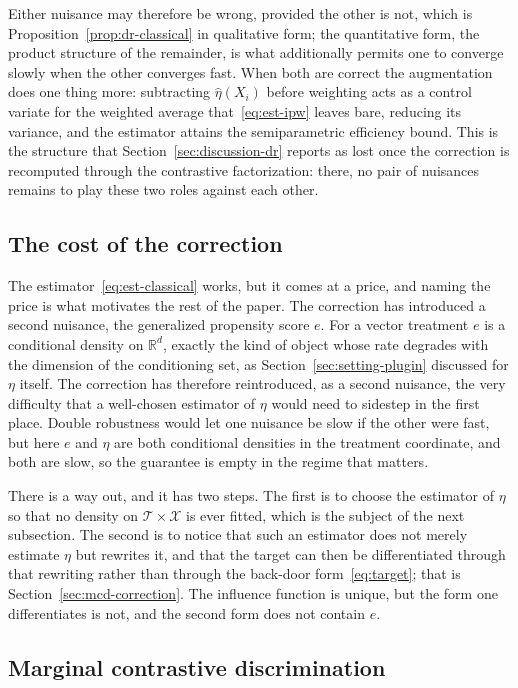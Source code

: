 \documentclass[11pt]{article}
\theoremstyle{plain}
\theoremstyle{definition}
\theoremstyle{remark}
\newcommand{\R}{\mathbb{R}}
\newcommand{\cX}{\ensuremath{\mathcal{X}}}
\newcommand{\cT}{\ensuremath{\mathcal{T}}}
\newcommand{\gps}{e}
\begin{document}
Either nuisance may therefore be wrong, provided the other is not, which is
Proposition~\ref{prop:dr-classical} in qualitative form; the quantitative form, the product
structure of the remainder, is what additionally permits one to converge slowly when the other
converges fast. When both are correct the augmentation does one thing more: subtracting
$\widehat\eta(X_i)$ before weighting acts as a control variate for the weighted average
that~\eqref{eq:est-ipw} leaves bare, reducing its variance, and the estimator attains the
semiparametric efficiency bound. This is the structure that Section~\ref{sec:discussion-dr}
reports as lost once the correction is recomputed through the contrastive factorization:
there, no pair of nuisances remains to play these two roles against each other.

\subsection{The cost of the correction}
\label{sec:eif-cost}

The estimator~\eqref{eq:est-classical} works, but it comes at a price, and naming the price is
what motivates the rest of the paper. The correction has introduced a second nuisance, the
generalized propensity score $\gps$. For a vector treatment $\gps$ is a conditional density on
$\R^{d}$, exactly the kind of object whose rate degrades with the dimension of the conditioning
set, as Section~\ref{sec:setting-plugin} discussed for $\eta$ itself. The correction has
therefore reintroduced, as a second nuisance, the very difficulty that a well-chosen estimator
of $\eta$ would need to sidestep in the first place. Double robustness would let one nuisance
be slow if the other were fast, but here $\gps$ and $\eta$ are both conditional densities in
the treatment coordinate, and both are slow, so the guarantee is empty in the regime that
matters.

There is a way out, and it has two steps. The first is to choose the estimator of $\eta$ so
that no density on $\cT\times\cX$ is ever fitted, which is the subject of the next
subsection. The second is to notice that such an estimator does not merely estimate $\eta$ but
rewrites it, and that the target can then be differentiated through that rewriting rather than
through the back-door form~\eqref{eq:target}; that is Section~\ref{sec:mcd-correction}. The
influence function is unique, but the form one differentiates is not, and the second form does
not contain $\gps$.

\subsection{Marginal contrastive discrimination}
\label{sec:mcd}
\end{document}
